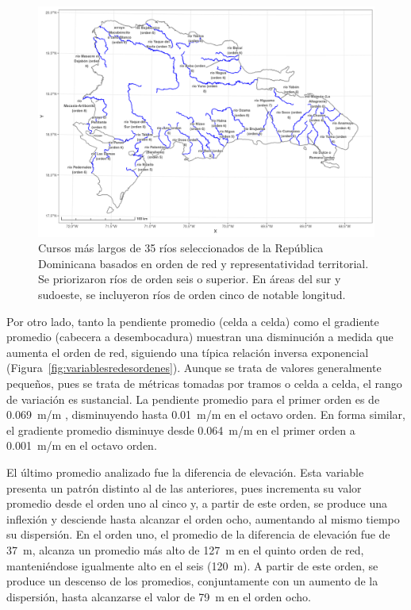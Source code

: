 \documentclass[spanish]{article}
\begin{document}
\begin{figure}[H]

{\centering \includegraphics[width=1\linewidth]{figuras/cursos-mas-largos} 

}

\caption{Cursos más largos de 35 ríos seleccionados de la República Dominicana basados en orden de red y representatividad territorial. Se priorizaron ríos de orden seis o superior. En áreas del sur y sudoeste, se incluyeron ríos de orden cinco de notable longitud.}\label{fig:cursosmaslargos}
\end{figure}

Por otro lado, tanto la pendiente promedio (celda a celda) como el
gradiente promedio (cabecera a desembocadura) muestran una disminución a
medida que aumenta el orden de red, siguiendo una típica relación
inversa exponencial (Figura~\ref{fig:variablesredesordenes}). Aunque se
trata de valores generalmente pequeños, pues se trata de métricas
tomadas por tramos o celda a celda, el rango de variación es sustancial.
La pendiente promedio para el primer orden es de 0.069~m/m ,
disminuyendo hasta 0.01~m/m en el octavo orden. En forma similar, el
gradiente promedio disminuye desde 0.064~m/m en el primer orden a
0.001~m/m en el octavo orden.

El último promedio analizado fue la diferencia de elevación. Esta
variable presenta un patrón distinto al de las anteriores, pues
incrementa su valor promedio desde el orden uno al cinco y, a partir de
este orden, se produce una inflexión y desciende hasta alcanzar el orden
ocho, aumentando al mismo tiempo su dispersión. En el orden uno, el
promedio de la diferencia de elevación fue de 37~m, alcanza un promedio
más alto de 127~m en el quinto orden de red, manteniéndose igualmente
alto en el seis (120~m). A partir de este orden, se produce un descenso
de los promedios, conjuntamente con un aumento de la dispersión, hasta
alcanzarse el valor de 79~m en el orden ocho.
\end{document}
